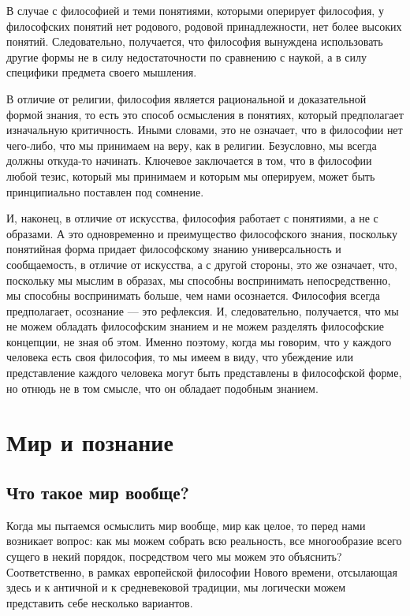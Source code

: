 \documentclass[oneside,final,14pt]{extreport}
\begin{document}
В случае с философией и теми понятиями, которыми оперирует философия, у философских понятий нет родового, родовой принадлежности, нет более высоких понятий. Следовательно, получается, что философия вынуждена использовать другие формы не в силу недостаточности по сравнению с наукой, а в силу специфики предмета своего мышления.

В отличие от религии, философия является рациональной и доказательной формой знания, то есть это способ осмысления в понятиях, который предполагает изначальную критичность. Иными словами, это не означает, что в философии нет чего-либо, что мы принимаем на веру, как в религии. Безусловно, мы всегда должны откуда-то начинать. Ключевое заключается в том, что в философии любой тезис, который мы принимаем и которым мы оперируем, может быть принципиально поставлен под сомнение.

И, наконец, в отличие от искусства, философия работает с понятиями, а не с образами. А это одновременно и преимущество философского знания, поскольку понятийная форма придает философскому знанию универсальность и сообщаемость, в отличие от искусства, а с другой стороны, это же означает, что, поскольку мы мыслим в образах, мы способны воспринимать непосредственно, мы способны воспринимать больше, чем нами осознается. Философия всегда предполагает, осознание — это рефлексия. И, следовательно, получается, что мы не можем обладать философским знанием и не можем разделять философские концепции, не зная об этом. Именно поэтому, когда мы говорим, что у каждого человека есть своя философия, то мы имеем в виду, что убеждение или представление каждого человека могут быть представлены в философской форме, но отнюдь не в том смысле, что он обладает подобным знанием.

\chapter{Мир и познание}
\section{Что такое мир вообще?}


Когда мы пытаемся осмыслить мир вообще, мир как целое, то перед нами возникает вопрос: как мы можем собрать всю реальность, все многообразие всего сущего в некий порядок, посредством чего мы можем это объяснить? Соответственно, в рамках европейской философии Нового времени, отсылающая здесь и к античной и к средневековой традиции, мы логически можем представить себе несколько вариантов.
\end{document}
